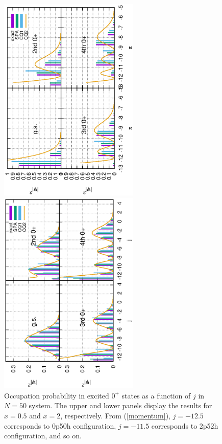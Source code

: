 \documentclass[%
superscriptaddress,
preprint,
showpacs,
nofootinbib,
amsmath,amssymb,
prc,
floatfix ]%
{revtex4-1}
\begin{document}
\begin{figure}[htbp]
 \begin{minipage}{1\hsize}
 \begin{center}
  \includegraphics[width=67mm,angle=-90]{images/N50Xeq0p5occ.eps}
 \end{center}
 \end{minipage}
 \begin{minipage}{1\hsize}
 \begin{center}
  \includegraphics[width=67mm,angle=-90]{images/N50Xeq2occ.eps}
 \end{center}
 \end{minipage}
 \caption{Occupation probability in excited $0^+$ states as a function of $j$ in $N=50$ system. The upper and lower panels display the results for $x=0.5$ and $x=2$, respectively. From (\ref{momentum}), $j=-12.5$ corresponds to 0p50h configuration, $j=-11.5$ corresponds to 2p52h configuration, and so on.}
 \label{fig:N50_occ}
\end{figure}
\end{document}
